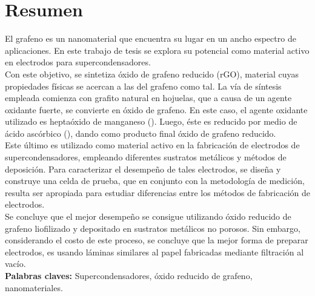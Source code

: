 \chapter*{Resumen}
El grafeno es un nanomaterial que encuentra su lugar en un ancho espectro de aplicaciones. En este trabajo de tesis se explora su potencial como material activo en electrodos para supercondensadores.\\
Con este objetivo, se sintetiza óxido de grafeno reducido (rGO), material cuyas propiedades físicas se acercan a las del grafeno como tal. La vía de síntesis empleada comienza con grafito natural en hojuelas, que a causa de un agente oxidante fuerte, se convierte en óxido de grafeno. En este caso, el agente oxidante utilizado es heptaóxido de manganeso (). Luego, éste es reducido por medio de ácido ascórbico (), dando como producto final óxido de grafeno reducido.\\
Este último es utilizado como material activo en la fabricación de electrodos de supercondensadores, empleando diferentes sustratos metálicos y métodos de deposición. Para caracterizar el desempeño de tales electrodos, se diseña y construye una celda de prueba, que en conjunto con la metodología de medición, resulta ser apropiada para estudiar diferencias entre los métodos de fabricación de electrodos.\\
Se concluye que el mejor desempeño se consigue utilizando óxido reducido de grafeno liofilizado y depositado en sustratos metálicos no porosos. Sin embargo, considerando el costo de este proceso, se concluye que la mejor forma de preparar electrodos, es usando láminas similares al papel fabricadas mediante filtración al vacío.\\
\hfill
\textbf{Palabras claves:} Supercondensadores, óxido reducido de grafeno, nanomateriales.

